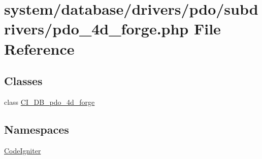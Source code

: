 \hypertarget{pdo__4d__forge_8php}{}\section{system/database/drivers/pdo/subdrivers/pdo\+\_\+4d\+\_\+forge.php File Reference}
\label{pdo__4d__forge_8php}
\subsection*{Classes}
\begin{DoxyCompactItemize}
\item 
class \mbox{\hyperlink{class_c_i___d_b__pdo__4d__forge}{C\+I\+\_\+\+D\+B\+\_\+pdo\+\_\+4d\+\_\+forge}}
\end{DoxyCompactItemize}
\subsection*{Namespaces}
\begin{DoxyCompactItemize}
\item 
 \mbox{\hyperlink{namespace_code_igniter}{Code\+Igniter}}
\end{DoxyCompactItemize}
